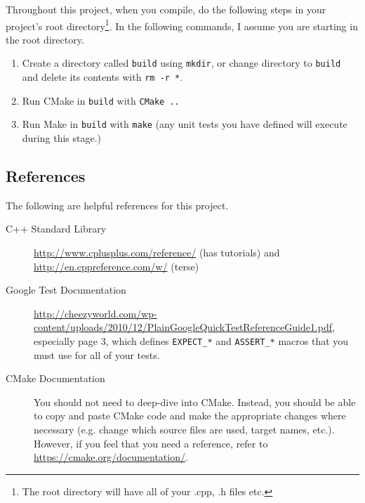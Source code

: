 \documentclass[paper=a4, fontsize=11pt]{scrartcl} %
\numberwithin{equation}{section} %
\numberwithin{figure}{section} %
\numberwithin{table}{section} %
\begin{document}
Throughout this project, when you compile, do the following steps in your project's root directory\footnote{The root directory will have all of your .cpp, .h files etc.}.
In the following commands, I assume you are starting in the root directory.
\begin{enumerate}
	\item Create a directory called \texttt{build} using \texttt{mkdir}, or change directory to \texttt{build} and delete its contents with \texttt{rm -r *}.
	\item Run CMake in \texttt{build} with \texttt{CMake ..}
	\item Run Make in \texttt{build} with \texttt{make} (any unit tests you have defined will execute during this stage.)
\end{enumerate}

\subsection*{References}
The following are helpful references for this project.
\begin{description}
	\item[C++ Standard Library] \url{http://www.cplusplus.com/reference/} (has tutorials) and \url{http://en.cppreference.com/w/} (terse)
	\item[Google Test Documentation] \url{http://cheezyworld.com/wp-content/uploads/2010/12/PlainGoogleQuickTestReferenceGuide1.pdf}, especially page 3, which defines \texttt{EXPECT\_*} and \texttt{ASSERT\_*} macros that you must use for all of your tests.
	\item[CMake Documentation] You should not need to deep-dive into CMake. Instead, you should be able to copy and paste CMake code and make the appropriate changes where necessary (e.g. change which source files are used, target names, etc.). However, if you feel that you need a reference, refer to \url{https://cmake.org/documentation/}.
\end{description}
\end{document}
